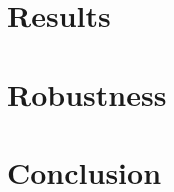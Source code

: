 \documentclass{article}
\begin{document}
\section{Results}





\section{Robustness}





\section{Conclusion}






\clearpage
{
    \singlespacing
    
}
\end{document}

